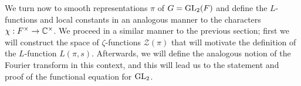 We turn now to smooth representations $\pi$ of $G=\mathrm{GL}_2(F)$ and define the $L$-functions and local constants in an analogous manner to the characters $\chi :F^\times \to \mathbb{C}^\times$. We proceed in a similar manner to the previous section; first we will construct the space of $\zeta$-functions $\mathcal{Z}(\pi)$ that will motivate the definition of the $L$-function $L(\pi,s)$. Afterwards, we will define the analogous notion of the Fourier transform in this context, and this will lead us to the statement and proof of the functional equation for $\mathrm{GL}_2$.







\newpage